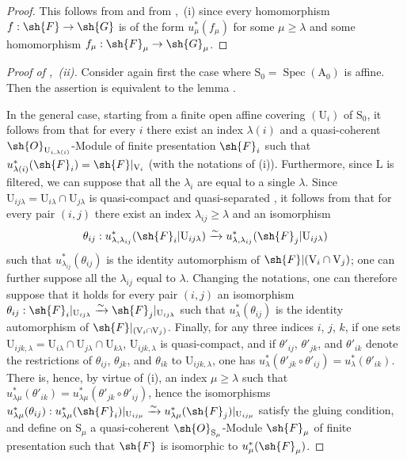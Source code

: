 \begin{proof}
This follows from  and from ,~(i) since every homomorphism $f:\sh{F}\to\sh{G}$ is of the form $u_\mu^*(f_\mu)$ for some $\mu\geqslant\lambda$ and some homomorphism $f_\mu:\sh{F}_\mu\to\sh{G}_\mu$.
\end{proof}

\begin{proof}[Proof of ,~(ii)]
Consider again first the case where $\mathrm{S}_0=\operatorname{Spec}(\mathrm{A}_0)$ is affine.
Then the assertion is equivalent to the lemma .

In the general case, starting from a finite open affine covering $(\mathrm{U}_i)$ of $\mathrm{S}_0$, it follows from  that for every $i$ there exist an index $\lambda(i)$ and a quasi-coherent $\sh{O}_{\mathrm{U}_{i,\lambda(i)}}$-Module of finite presentation $\sh{F}_i$ such that $u_{\lambda(i)}^*(\sh{F}_i)=\sh{F}|_{\mathrm{V}_i}$ (with the notations of (i)).
Furthermore, since $\mathrm{L}$ is filtered, we can suppose that all the $\lambda_i$ are equal to a single $\lambda$.
Since $\mathrm{U}_{ij\lambda}=\mathrm{U}_{i\lambda}\cap\mathrm{U}_{j\lambda}$ is quasi-compact and quasi-separated , it follows from  that for every pair $(i,j)$ there exist an index $\lambda_{ij}\geqslant\lambda$ and an isomorphism
\[
  \theta_{ij}:u_{\lambda,\lambda_{ij}}^*(\sh{F}_i|\mathrm{U}_{ij\lambda})\xrightarrow{\sim}u_{\lambda,\lambda_{ij}}^*(\sh{F}_j|\mathrm{U}_{ij\lambda})
\]
such that $u_{\lambda_{ij}}^*(\theta_{ij})$ is the identity automorphism of $\sh{F}|(\mathrm{V}_i\cap\mathrm{V}_j)$; one can further suppose all the $\lambda_{ij}$ equal to $\lambda$.
Changing the notations, one can therefore suppose that it holds for every pair $(i,j)$ an isomorphism $\theta_{ij}:\sh{F}_i|_{\mathrm{U}_{ij\lambda}}\xrightarrow{\sim}\sh{F}_j|_{\mathrm{U}_{ij\lambda}}$ such that $u_\lambda^*(\theta_{ij})$ is the identity automorphism of $\sh{F}|_{(\mathrm{V}_i\cap\mathrm{V}_j)}$.
Finally, for any three indices $i$, $j$, $k$, if one sets $\mathrm{U}_{ijk,\lambda}=\mathrm{U}_{i\lambda}\cap\mathrm{U}_{j\lambda}\cap\mathrm{U}_{k\lambda}$, $\mathrm{U}_{ijk,\lambda}$ is quasi-compact, and if $\theta'_{ij}$, $\theta'_{jk}$, and $\theta'_{ik}$ denote the restrictions of $\theta_{ij}$, $\theta_{jk}$, and $\theta_{ik}$ to $\mathrm{U}_{ijk,\lambda}$, one has $u_\lambda^*(\theta'_{jk}\circ\theta'_{ij})=u_\lambda^*(\theta'_{ik})$.
There is, hence, by virtue of (i), an index $\mu\geqslant\lambda$ such that $u_{\lambda\mu}^*(\theta'_{ik})=u_{\lambda\mu}^*(\theta'_{jk}\circ\theta'_{ij})$, hence the isomorphisms $u_{\lambda\mu}^*(\theta_{ij}):u_{\lambda\mu}^*(\sh{F}_i)|_{\mathrm{U}_{ij\mu}}\xrightarrow{\sim}u_{\lambda\mu}^*(\sh{F}_j)|_{\mathrm{U}_{ij\mu}}$ satisfy the gluing condition, and define on $\mathrm{S}_\mu$ a quasi-coherent $\sh{O}_{\mathrm{S}_\mu}$-Module $\sh{F}_\mu$ of finite presentation  such that $\sh{F}$ is isomorphic to $u_\mu^*(\sh{F}_\mu)$.
\end{proof}

